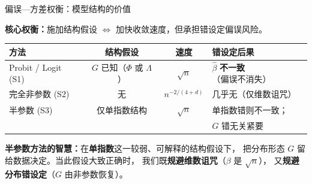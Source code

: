 \documentclass[aspectratio=169, 10pt]{beamer}
\begin{document}
\begin{frame}{偏误—方差权衡：模型结构的价值}

  \textbf{核心权衡：}施加结构假设 $\Leftrightarrow$ 加快收敛速度，但承担错设定偏误风险。

  \vspace{0.3em}
  \begin{center}\footnotesize
  \begin{tabular}{p{3.5cm}|c|c|p{4cm}}
  \hline
  方法 & 结构假设 & 速度 & 错设定后果 \\
  \hline
  Probit / Logit (S1) & $G$ 已知（$\Phi$ 或 $\Lambda$） & $\sqrt{n}$ & $\hat\beta$ \textbf{不一致}（偏误不消失）\\
  完全非参数 (S2) & 无 & $n^{-2/(4+d)}$ & 几乎无（仅维数诅咒）\\
  半参数 (S3) & 仅单指数结构 & $\sqrt{n}$ & 单指数错则不一致；\\
  & & & $G$ 错无关紧要\\
  \hline
  \end{tabular}
  \end{center}

  \vspace{0.3em}
  \begin{keybox}
    \textbf{半参数方法的智慧：}在\textbf{单指数}这一较弱、可解释的结构假设下，
    把分布形态 $G$ 留给数据决定。当此假设大致正确时，
    我们既\textbf{规避维数诅咒}（$\beta$ 是 $\sqrt{n}$），
    又\textbf{规避分布错设定}（$G$ 由非参数恢复）。
  \end{keybox}

\end{frame}
\end{document}
